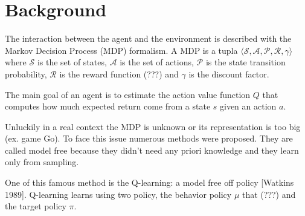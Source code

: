 \section{Background}


The interaction between the agent and the environment is described  with the
Markov Decision Process (MDP) formalism. A MDP is a tupla $\langle \mathcal{S}, 
\mathcal{A}, \mathcal{P}, \mathcal{R}, \gamma \rangle$ where $\mathcal{S}$ is
the set of states, $\mathcal{A}$ is the set of actions, $\mathcal{P}$ is the 
state transition probability, $\mathcal{R}$ is the reward function (???) and 
$\gamma$ is the discount factor.

The main goal of an agent is to estimate the action value function $Q$ that 
computes how much expected return come from a state $s$ given an action $a$.


Unluckily in a real context the MDP is unknown or its representation is too big
(ex. game Go). To face this issue numerous methods were proposed. They are 
called model free because they didn't need any priori knowledge and they learn 
only from sampling.

One of this famous method is the Q-learning: a model free off policy [Watkins 
1989]. Q-learning learns using two policy, the behavior policy $\mu$ that (???) 
and the target policy $\pi$.


